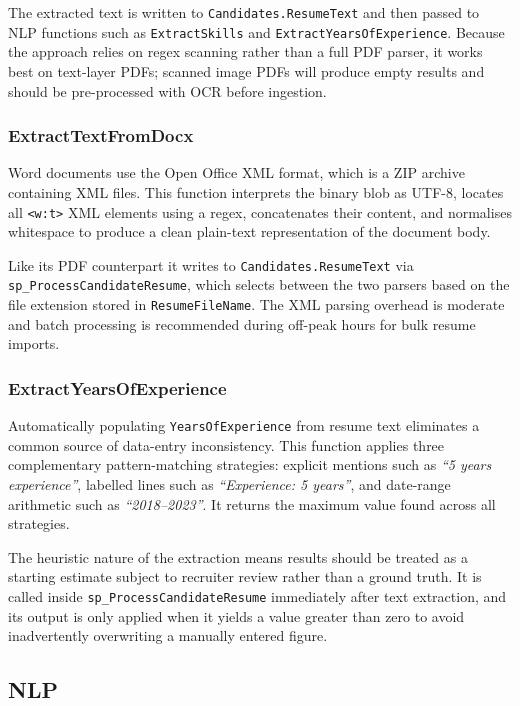 \documentclass[11pt,a4paper]{article}
\begin{document}
The extracted text is written to \texttt{Candidates.ResumeText} and then passed to NLP functions such as \texttt{ExtractSkills} and \texttt{ExtractYearsOfExperience}. Because the approach relies on regex scanning rather than a full PDF parser, it works best on text-layer PDFs; scanned image PDFs will produce empty results and should be pre-processed with OCR before ingestion.

\subsubsection{ExtractTextFromDocx}
\noindent
Word documents use the Open Office XML format, which is a ZIP archive containing XML files. This function interprets the binary blob as UTF-8, locates all \texttt{<w:t>} XML elements using a regex, concatenates their content, and normalises whitespace to produce a clean plain-text representation of the document body.

Like its PDF counterpart it writes to \texttt{Candidates.ResumeText} via \texttt{sp\_ProcessCandidateResume}, which selects between the two parsers based on the file extension stored in \texttt{ResumeFileName}. The XML parsing overhead is moderate and batch processing is recommended during off-peak hours for bulk resume imports.

\subsubsection{ExtractYearsOfExperience}
\noindent
Automatically populating \texttt{YearsOfExperience} from resume text eliminates a common source of data-entry inconsistency. This function applies three complementary pattern-matching strategies: explicit mentions such as \textit{``5 years experience''}, labelled lines such as \textit{``Experience: 5 years''}, and date-range arithmetic such as \textit{``2018--2023''}. It returns the maximum value found across all strategies.

The heuristic nature of the extraction means results should be treated as a starting estimate subject to recruiter review rather than a ground truth. It is called inside \texttt{sp\_ProcessCandidateResume} immediately after text extraction, and its output is only applied when it yields a value greater than zero to avoid inadvertently overwriting a manually entered figure.

\subsection{NLP}
\end{document}
